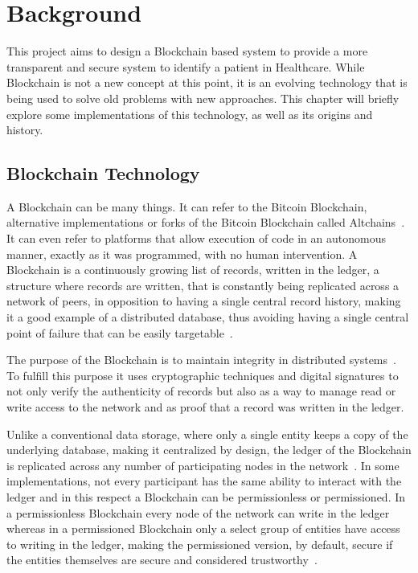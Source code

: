 \chapter{Background}\label{background}

This project aims to design a Blockchain based system to provide a more
transparent and secure system to identify a patient in Healthcare. While
Blockchain is not a new concept at this point, it is an evolving technology
that is being used to solve old problems with new approaches. This chapter will
briefly explore some implementations of this technology, as well as its origins
and history.

\section{Blockchain Technology}

  A Blockchain can be many things. It can refer to the Bitcoin Blockchain,
  alternative implementations or forks of the Bitcoin Blockchain called
  Altchains~\cite{Lewis2015}. It can even refer to platforms that allow
  execution of code in an autonomous manner, exactly as it was programmed, with
  no human intervention.  A Blockchain is a continuously growing list of
  records, written in the ledger, a structure where records are written, that
  is constantly being replicated across a network of peers, in opposition to
  having a single central record history, making it a good example of a
  distributed database, thus avoiding having a single central point of failure
  that can be easily targetable~\cite{Barclay2017}.

  The purpose of the Blockchain is to maintain integrity in distributed
  systems~\cite{Drescher2017}. To fulfill this purpose it uses cryptographic
  techniques and digital signatures to not only verify the authenticity of
  records but also as a way to manage read or write access to the network and
  as proof that a record was written in the ledger.

  Unlike a conventional data storage, where only a single entity keeps a copy
  of the underlying database, making it centralized by design, the ledger of
  the Blockchain is replicated across any number of participating nodes in the
  network~\cite{Lewis2015}. In some implementations, not every participant has
  the same ability to interact with the ledger and in this respect a Blockchain
  can be permissionless or permissioned. In a permissionless Blockchain every
  node of the network can write in the ledger whereas in a permissioned
  Blockchain only a select group of entities have access to writing in the
  ledger, making the permissioned version, by default, secure if the entities
  themselves are secure and considered
  trustworthy~\cite{Lewis2015,Valenta2017}.

